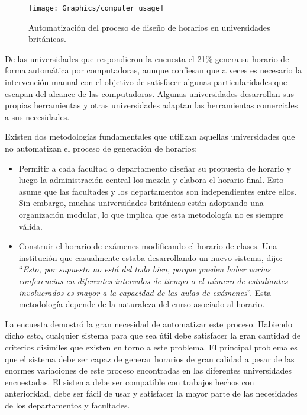 \begin{figure}
	\begin{center}
		\texttt{[image: Graphics/computer\_usage]}
		\caption{Automatización del proceso de diseño de horarios en universidades británicas.}
	\end{center}	
\end{figure}

De las universidades que respondieron la encuesta el 21\% genera su horario de forma automática por
computadoras, aunque confiesan que a veces es necesario la intervención manual con el objetivo de satisfacer
algunas particularidades que escapan del alcance de las computadoras. Algunas universidades desarrollan
sus propias herramientas y otras universidades adaptan las herramientas comerciales a sus necesidades.

Existen dos metodologías fundamentales que utilizan aquellas universidades que no automatizan el proceso de
generación de horarios:

\begin{itemize}
	\item Permitir a cada facultad o departamento diseñar su propuesta de horario y luego la administración
		central los mezcla y elabora el horario final. Esto asume que las facultades y los departamentos
		son independientes entre ellos. Sin embargo, muchas universidades británicas están adoptando una
		organización modular, lo que implica que esta metodología no es siempre válida.
	\item Construir el horario de exámenes modificando el horario de clases. Una institución que casualmente
		estaba desarrollando un nuevo sistema, dijo: ``\emph{Esto, por supuesto no está del todo bien, porque
		pueden haber varias conferencias en diferentes intervalos de tiempo o el número de estudiantes involucrados
		es mayor a la capacidad de las aulas de exámenes}''. Esta metodología depende de la naturaleza del curso
		asociado al horario.
\end{itemize}

La encuesta demostró la gran necesidad de automatizar este proceso. Habiendo dicho esto, cualquier sistema
para que sea útil debe satisfacer la gran cantidad de criterios disimiles que existen en torno a este problema.
El principal problema es que el sistema debe ser capaz de generar horarios de gran calidad a pesar de las enormes
variaciones de este proceso encontradas en las diferentes universidades encuestadas. El sistema debe ser compatible
con trabajos hechos con anterioridad, debe ser fácil de usar y satisfacer la mayor parte de las necesidades de los departamentos y facultades.

